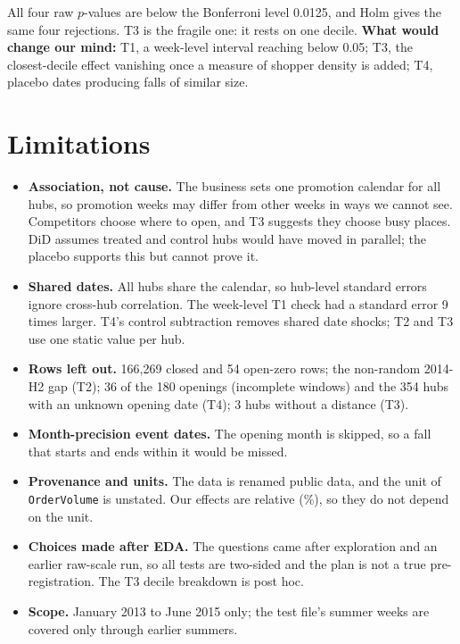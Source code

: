 \documentclass[10pt,a4paper,twocolumn]{article}
\newcommand{\code}[1]{\texttt{#1}}
\begin{document}
All four raw $p$-values are below the Bonferroni level 0.0125, and Holm gives the same four rejections. T3 is the fragile one: it rests on one decile.
\textbf{What would change our mind:} T1, a week-level interval reaching below 0.05; T3, the closest-decile effect
vanishing once a measure of shopper density is added; T4, placebo dates producing falls of similar size.

\section{Limitations}

\begin{itemize}
  \item \textbf{Association, not cause.} The business sets one promotion calendar for all hubs, so promotion weeks may
  differ from other weeks in ways we cannot see. Competitors choose where to open, and T3 suggests they choose busy
  places. DiD assumes treated and control hubs would have moved in parallel; the placebo supports this but cannot prove it.
  \item \textbf{Shared dates.} All hubs share the calendar, so hub-level standard errors ignore cross-hub correlation.
  The week-level T1 check had a standard error 9 times larger. T4's control subtraction removes shared date shocks;
  T2 and T3 use one static value per hub.
  \item \textbf{Rows left out.} 166{,}269 closed and 54 open-zero rows; the non-random 2014-H2 gap (T2); 36 of the 180
  openings (incomplete windows) and the 354 hubs with an unknown opening date (T4); 3 hubs without a distance (T3).
  \item \textbf{Month-precision event dates.} The opening month is skipped, so a fall that starts and ends within it
  would be missed.
  \item \textbf{Provenance and units.} The data is renamed public data, and the unit of \code{OrderVolume} is unstated.
  Our effects are relative (\%), so they do not depend on the unit.
  \item \textbf{Choices made after EDA.} The questions came after exploration and an earlier raw-scale run, so all tests
  are two-sided and the plan is not a true pre-registration. The T3 decile breakdown is post hoc.
  \item \textbf{Scope.} January 2013 to June 2015 only; the test file's summer weeks are covered only through earlier
  summers.
\end{itemize}
\end{document}
